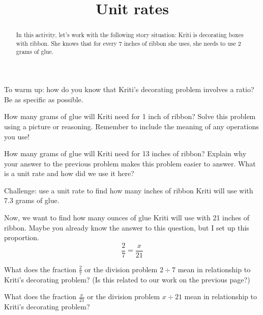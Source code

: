 \documentclass[nooutcomes,noauthor,handout]{ximera}
\title{Unit rates}
\begin{document}
\begin{abstract}
In this activity, let's work with the following story situation: Kriti is decorating boxes with ribbon. She knows that for every 7 inches of ribbon she uses, she needs to use 2 grams of glue. 
\end{abstract}
\maketitle


\begin{problem}
To warm up: how do you know that Kriti's decorating problem involves a ratio? Be as specific as possible.

\end{problem}


\begin{problem}
How many grams of glue will Kriti need for 1 inch of ribbon? Solve this problem using a picture or reasoning. Remember to include the meaning of any operations you use!
\end{problem}


\begin{problem}
How many grams of glue will Kriti need for 13 inches of ribbon? Explain why your answer to the previous problem makes this problem easier to answer. What is a unit rate and how did we use it here?

\end{problem}



\begin{problem}
Challenge: use a unit rate to find how many inches of ribbon Kriti will use with 7.3 grams of glue.
\end{problem}

\newpage


Now, we want to find how many ounces of glue Kriti will use with 21 inches of ribbon. Maybe you already know the answer to this question, but I set up this proportion.
\[
\frac{2}{7} = \frac{x}{21}
\]

\begin{problem}
What does the fraction $\frac{2}{7}$ or the division problem $2 \div 7$ mean in relationship to Kriti's decorating problem? (Is this related to our work on the previous page?)
\end{problem}


\begin{problem}
What does the fraction $\frac{x}{21}$ or the division problem $x \div 21$ mean in relationship to Kriti's decorating problem?
\end{problem}
\end{document}
